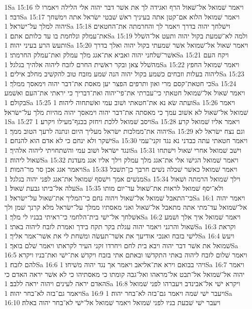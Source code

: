 1Sa 15:16  ויאמר שׁמואל אל־שׁאול הרף ואגידה לך את אשׁר דבר יהוה אלי הלילה ויאמרו לו דבר׃
1Sa 15:17  ויאמר שׁמואל הלוא אם־קטן אתה בעיניך ראשׁ שׁבטי ישׂראל אתה וימשׁחך יהוה למלך על־ישׂראל׃
1Sa 15:18  וישׁלחך יהוה בדרך ויאמר לך והחרמתה את־החטאים את־עמלק ונלחמת בו עד כלותם אתם׃
1Sa 15:19  ולמה לא־שׁמעת בקול יהוה ותעט אל־השׁלל ותעשׂ הרע בעיני יהוה׃
1Sa 15:20  ויאמר שׁאול אל־שׁמואל אשׁר שׁמעתי בקול יהוה ואלך בדרך אשׁר־שׁלחני יהוה ואביא את־אגג מלך עמלק ואת־עמלק החרמתי׃
1Sa 15:21  ויקח העם מהשׁלל צאן ובקר ראשׁית החרם לזבח ליהוה אלהיך בגלגל׃
1Sa 15:22  ויאמר שׁמואל החפץ ליהוה בעלות וזבחים כשׁמע בקול יהוה הנה שׁמע מזבח טוב להקשׁיב מחלב אילים׃
1Sa 15:23  כי חטאת־קסם מרי ואון ותרפים הפצר יען מאסת את־דבר יהוה וימאסך ממלך׃
1Sa 15:24  ויאמר שׁאול אל־שׁמואל חטאתי כי־עברתי את־פי־יהוה ואת־דבריך כי יראתי את־העם ואשׁמע בקולם׃
1Sa 15:25  ועתה שׂא נא את־חטאתי ושׁוב עמי ואשׁתחוה ליהוה׃
1Sa 15:26  ויאמר שׁמואל אל־שׁאול לא אשׁוב עמך כי מאסתה את־דבר יהוה וימאסך יהוה מהיות מלך על־ישׂראל׃
1Sa 15:27  ויסב שׁמואל ללכת ויחזק בכנף־מעילו ויקרע׃
1Sa 15:28  ויאמר אליו שׁמואל קרע יהוה את־ממלכות ישׂראל מעליך היום ונתנה לרעך הטוב ממך׃
1Sa 15:29  וגם נצח ישׂראל לא ישׁקר ולא ינחם כי לא אדם הוא להנחם׃
1Sa 15:30  ויאמר חטאתי עתה כבדני נא נגד זקני־עמי ונגד ישׂראל ושׁוב עמי והשׁתחויתי ליהוה אלהיך׃
1Sa 15:31  וישׁב שׁמואל אחרי שׁאול וישׁתחו שׁאול ליהוה׃
1Sa 15:32  ויאמר שׁמואל הגישׁו אלי את־אגג מלך עמלק וילך אליו אגג מעדנת ויאמר אגג אכן סר מר־המות׃
1Sa 15:33  ויאמר שׁמואל כאשׁר שׁכלה נשׁים חרבך כן־תשׁכל מנשׁים אמך וישׁסף שׁמואל את־אגג לפני יהוה בגלגל׃
1Sa 15:34  וילך שׁמואל הרמתה ושׁאול עלה אל־ביתו גבעת שׁאול׃
1Sa 15:35  ולא־יסף שׁמואל לראות את־שׁאול עד־יום מותו כי־התאבל שׁמואל אל־שׁאול ויהוה נחם כי־המליך את־שׁאול על־ישׂראל׃
1Sa 16:1  ויאמר יהוה אל־שׁמואל עד־מתי אתה מתאבל אל־שׁאול ואני מאסתיו ממלך על־ישׂראל מלא קרנך שׁמן ולך אשׁלחך אל־ישׁי בית־הלחמי כי־ראיתי בבניו לי מלך׃
1Sa 16:2  ויאמר שׁמואל איך אלך ושׁמע שׁאול והרגני ויאמר יהוה עגלת בקר תקח בידך ואמרת לזבח ליהוה באתי׃
1Sa 16:3  וקראת לישׁי בזבח ואנכי אודיעך את אשׁר־תעשׂה ומשׁחת לי את אשׁר־אמר אליך׃
1Sa 16:4  ויעשׂ שׁמואל את אשׁר דבר יהוה ויבא בית לחם ויחרדו זקני העיר לקראתו ויאמר שׁלם בואך׃
1Sa 16:5  ויאמר שׁלום לזבח ליהוה באתי התקדשׁו ובאתם אתי בזבח ויקדשׁ את־ישׁי ואת־בניו ויקרא להם לזבח׃
1Sa 16:6  ויהי בבואם וירא את־אליאב ויאמר אך נגד יהוה משׁיחו׃
1Sa 16:7  ויאמר יהוה אל־שׁמואל אל־תבט אל־מראהו ואל־גבה קומתו כי מאסתיהו כי לא אשׁר יראה האדם כי האדם יראה לעינים ויהוה יראה ללבב׃
1Sa 16:8  ויקרא ישׁי אל־אבינדב ויעברהו לפני שׁמואל ויאמר גם־בזה לא־בחר יהוה׃
1Sa 16:9  ויעבר ישׁי שׁמה ויאמר גם־בזה לא־בחר יהוה׃
1Sa 16:10  ויעבר ישׁי שׁבעת בניו לפני שׁמואל ויאמר שׁמואל אל־ישׁי לא־בחר יהוה באלה׃
